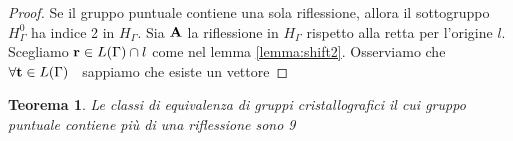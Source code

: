 \documentclass[a4paper,11pt,openright,twoside	]{book}
\newtheorem{theorem}{Teorema}[section]
\begin{document}
\begin{proof}
Se il gruppo puntuale contiene una sola riflessione, allora il sottogruppo $H_{\Gamma}^0$ ha indice 2 in $H_{\Gamma}$. Sia $\vb{A}$ la riflessione in $H_{\Gamma}$ rispetto alla retta per l'origine $l$. Scegliamo $\vb{r} \in L(\Gamma) \cap l$ come nel lemma \ref{lemma:shift2}. 
Osserviamo che $\forall \vb{t} \in L(\Gamma) \; \; $
  sappiamo che esiste un vettore 
\end{proof}

\begin{theorem}
Le classi di equivalenza di gruppi cristallografici il cui gruppo puntuale contiene più di una riflessione sono 9
\end{theorem}
\end{document}
